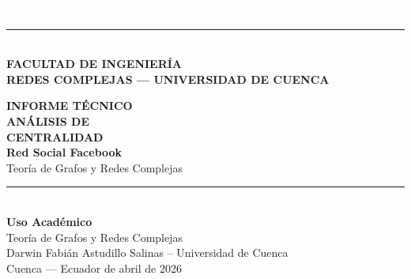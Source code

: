 \documentclass[12pt,a4paper,oneside,openany]{book}
\begin{document}
\pagestyle{empty}

\begin{titlepage}
  \thispagestyle{empty}
  \pagecolor{UCblue}
  \color{white}
  \vspace*{0.9cm}
  \begin{flushleft}
    {\fontsize{42}{46}\selectfont\bfseries\textcolor{white}{UCUENCA}}\\[-6pt]
    {\color{UCred}\rule{0.52\linewidth}{3pt}}\\[4pt]
    {\small\bfseries\color{white!80!UCblue}\MakeUppercase{Facultad de Ingeniería}}\\[2pt]
    {\fontsize{7}{8}\selectfont\bfseries\color{white!60!UCblue}%
      \MakeUppercase{Redes Complejas --- Universidad de Cuenca}}
  \end{flushleft}
  \vspace{3.8cm}
  \begin{flushleft}
    {\fontsize{10}{12}\selectfont\bfseries\color{white!70!UCblue}%
      \MakeUppercase{Informe Técnico}}\\[14pt]
    {\fontsize{38}{44}\selectfont\bfseries\color{white}%
      ANÁLISIS DE\\[4pt]CENTRALIDAD}\\[10pt]
    {\fontsize{22}{26}\selectfont\bfseries\color{white!85!UCblue}%
      Red Social Facebook}\\[6pt]
    {\small\color{white!60!UCblue}%
      Teoría de Grafos y Redes Complejas}
  \end{flushleft}
  \vfill
  \begin{flushleft}
    {\color{UCred}\rule{0.4\linewidth}{1pt}}\\[8pt]
    {\normalsize\bfseries\color{white}%
      Uso Académico}\\[4pt]
    {\small\color{white!70!UCblue}%
      Teoría de Grafos y Redes Complejas}\\[16pt]
    {\footnotesize\color{white!50!UCblue}%
      Darwin Fabián Astudillo Salinas -- Universidad de Cuenca}\\[4pt]
    {\footnotesize\color{white!50!UCblue}%
      Cuenca --- Ecuador  de abril de 2026}
  \end{flushleft}
  \vspace{0.6cm}
\end{titlepage}
\pagecolor{white}\color{black}
\pagestyle{fancy}
\end{document}
